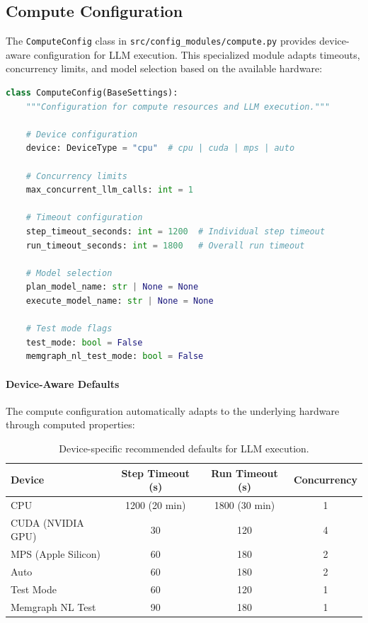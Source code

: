 \subsection{Compute Configuration}
\label{subsec:compute-config}

The \texttt{ComputeConfig} class in \texttt{src/config\_modules/compute.py} provides device-aware configuration for LLM execution. This specialized module adapts timeouts, concurrency limits, and model selection based on the available hardware:

\begin{lstlisting}[language=Python, caption=ComputeConfig class for device-aware settings]
class ComputeConfig(BaseSettings):
    """Configuration for compute resources and LLM execution."""
    
    # Device configuration
    device: DeviceType = "cpu"  # cpu | cuda | mps | auto
    
    # Concurrency limits
    max_concurrent_llm_calls: int = 1
    
    # Timeout configuration
    step_timeout_seconds: int = 1200  # Individual step timeout
    run_timeout_seconds: int = 1800   # Overall run timeout
    
    # Model selection
    plan_model_name: str | None = None
    execute_model_name: str | None = None
    
    # Test mode flags
    test_mode: bool = False
    memgraph_nl_test_mode: bool = False
\end{lstlisting}

\paragraph{Device-Aware Defaults}
The compute configuration automatically adapts to the underlying hardware through computed properties:

\begin{table}[ht]
\centering
\caption{Device-specific recommended defaults for LLM execution.}
\label{tab:device-defaults}
\begin{tabular}{lccc}
\hline
\textbf{Device} & \textbf{Step Timeout (s)} & \textbf{Run Timeout (s)} & \textbf{Concurrency} \\
\hline
CPU & 1200 (20 min) & 1800 (30 min) & 1 \\
CUDA (NVIDIA GPU) & 30 & 120 & 4 \\
MPS (Apple Silicon) & 60 & 180 & 2 \\
Auto & 60 & 180 & 2 \\
Test Mode & 60 & 120 & 1 \\
Memgraph NL Test & 90 & 180 & 1 \\
\hline
\end{tabular}
\end{table}

